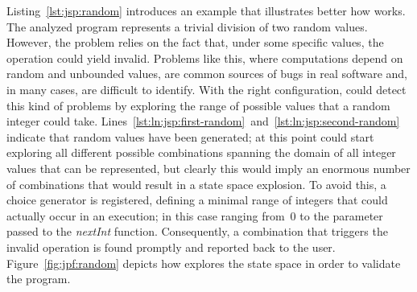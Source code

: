 Listing~\ref{lst:jsp:random} introduces an example that illustrates better how \jpf{} works. The analyzed program represents a trivial division of two random values. However, the problem relies on the fact that, under some specific values, the operation could yield invalid. Problems like this, where computations depend on random and unbounded values, are common sources of bugs in real software and, in many cases, are difficult to identify. With the right configuration, \jpf{} could detect this kind of problems by exploring the range of possible values that a random integer could take. Lines~\ref{lst:ln:jsp:first-random}~and~\ref{lst:ln:jsp:second-random} indicate that random values have been generated; at this point \jpf{} could start exploring all different possible combinations spanning the domain of all integer values that can be represented, but clearly this would imply an enormous number of combinations that would result in a state space explosion. To avoid this, a choice generator is registered, defining a minimal range of integers that could actually occur in an execution; in this case ranging from~0 to the parameter passed to the \textit{nextInt} function. Consequently, a combination that triggers the invalid operation is found promptly and reported back to the user. Figure~\ref{fig:jpf:random} depicts how \jpf{} explores the state space in order to validate the program.

